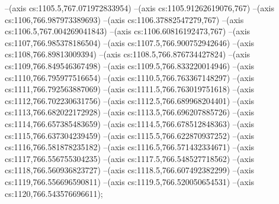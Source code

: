 --(axis cs:1105.5,767.071972833954)
--(axis cs:1105.91262619076,767)
--(axis cs:1106,766.987973389693)
--(axis cs:1106.37882547279,767)
--(axis cs:1106.5,767.004269041843)
--(axis cs:1106.60816192473,767)
--(axis cs:1107,766.985378186504)
--(axis cs:1107.5,766.900752942646)
--(axis cs:1108,766.89813009394)
--(axis cs:1108.5,766.876734427824)
--(axis cs:1109,766.849546367498)
--(axis cs:1109.5,766.833220014946)
--(axis cs:1110,766.795977516654)
--(axis cs:1110.5,766.763367148297)
--(axis cs:1111,766.792563887069)
--(axis cs:1111.5,766.763019751618)
--(axis cs:1112,766.702230631756)
--(axis cs:1112.5,766.689968204401)
--(axis cs:1113,766.682022172928)
--(axis cs:1113.5,766.696207885726)
--(axis cs:1114,766.657385483659)
--(axis cs:1114.5,766.678512848363)
--(axis cs:1115,766.637304239459)
--(axis cs:1115.5,766.622870937252)
--(axis cs:1116,766.581878235182)
--(axis cs:1116.5,766.571432334671)
--(axis cs:1117,766.556755304235)
--(axis cs:1117.5,766.548527718562)
--(axis cs:1118,766.560936823727)
--(axis cs:1118.5,766.607492382299)
--(axis cs:1119,766.556696590811)
--(axis cs:1119.5,766.520050654531)
--(axis cs:1120,766.543576696611);
